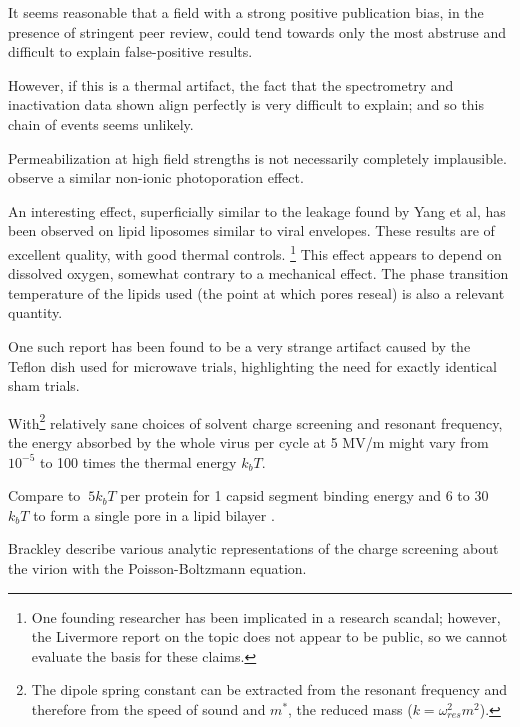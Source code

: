 \documentclass[paper.tex]{subfiles}
\begin{document}
\begin{multicols}{1}
It seems reasonable that a field with a strong positive publication bias\cite{Comprehensive2018}, in the presence of stringent peer review, could tend towards only the most abstruse and difficult to explain false-positive results. 

However, if this is a thermal artifact, the fact that the spectrometry and inactivation data shown align perfectly is very difficult to explain; and so this chain of events seems unlikely.

Permeabilization at high field strengths is not necessarily completely implausible. \cite{182015} observe a similar non-ionic photoporation effect.

An interesting effect, superficially similar to the leakage found by Yang et al, has been observed on lipid liposomes similar to viral envelopes\cite{MicrowaveStimulated1985}\cite{Influence}\cite{Correlation1994}\cite{contribution2019}. These results are of excellent quality, with good thermal controls. \footnote{One founding researcher has been implicated in a research scandal; however, the Livermore report on the topic does not appear to be public, so we cannot evaluate the basis for these claims.} This effect appears to depend on dissolved oxygen\cite{Microwaves1987}\cite{Microwaves1988}, somewhat contrary to a mechanical effect. The phase transition temperature of the lipids used (the point at which pores reseal) is also a relevant quantity. 

One such report has been found to be a very strange artifact caused by the Teflon dish used for microwave trials\cite{Effect1994a}, highlighting the need for exactly identical sham trials.



With\footnote{The dipole spring constant can be extracted from the resonant frequency and therefore from the speed of sound and $m^*$, the reduced mass ($k = \omega_{res}^2 m^2$). } relatively sane choices of solvent charge screening and resonant frequency, the energy absorbed by the whole virus per cycle at 5 MV/m might vary from $10^{-5}$ to 100 times the thermal energy $k_b T$.

Compare to $~5 k_b T$ per protein for 1 capsid segment binding energy \cite{Energies2012} \cite{Weak2002} and 6 to 30 $k_b T$ to form a single pore in a lipid bilayer \cite{Atomistic2014}. \cite{Electrostatic2020a}

Brackley \cite{Electrostatic2020} describe various analytic representations of the charge screening about the virion with the Poisson-Boltzmann equation. 


\end{multicols}
\end{document}
